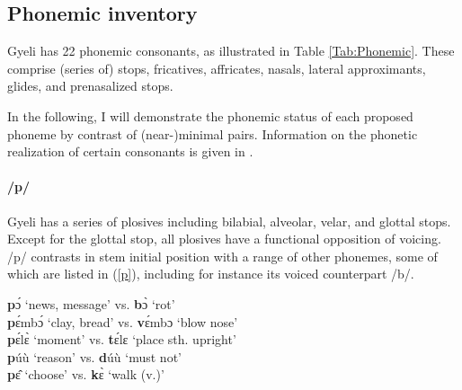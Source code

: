 \subsection{Phonemic inventory}
\label{sec:CPhon}

Gyeli has 22 phonemic consonants, as illustrated in Table \ref{Tab:Phonemic}. These comprise (series of) stops, fricatives, affricates,  nasals, lateral approximants, glides, and prenasalized stops.

\begin{table}
\centering
{}
\caption{Phonemic inventory}
\label{Tab:Phonemic}
\end{table}

\noindent In the following, I will demonstrate the phonemic status of each proposed phoneme by contrast of (near-)minimal pairs. Information on the phonetic realization of certain consonants is given in .

\paragraph{\bfseries /p/} Gyeli has a series of plosives including bilabial, alveolar, velar, and glottal stops. Except for the glottal stop, all plosives have a functional opposition of voicing. /p/ contrasts in stem initial position with a range of other phonemes, some of which are listed in (\ref{p}), including for instance its voiced counterpart /b/.

\begin{exe} \ex \label{p}
{\bfseries p}ɔ́ `news, message' vs. {\bfseries b}ɔ̀ `rot' \\
{\bfseries p}ɛ́mbɔ́ `clay, bread' vs. {\bfseries v}ɛ́mbɔ `blow nose' \\
{\bfseries p}ɛ́lɛ̀ `moment' vs. {\bfseries t}ɛ́lɛ `place sth. upright'  \\
{\bfseries p}úù `reason' vs. {\bfseries d}úù `must not'  \\
{\bfseries p}ɛ̂ `choose' vs. {\bfseries k}ɛ̀ `walk (v.)'
\end{exe}

